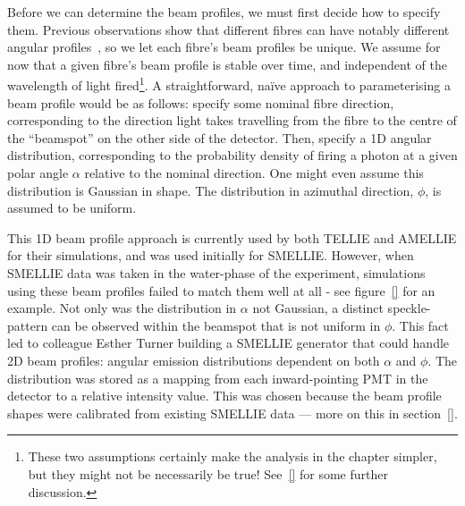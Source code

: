 Before we can determine the beam profiles, we must first decide how to specify them. Previous observations show that different fibres can have notably different angular profiles~\cite{}, so we let each fibre's beam profiles be unique. We assume for now that a given fibre's beam profile is stable over time, and independent of the wavelength of light fired\footnote{These two assumptions certainly make the analysis in the chapter simpler, but they might not be necessarily be true! See~\ref{} for some further discussion.}. A straightforward, na\"{i}ve approach to parameterising a beam profile would be as follows: specify some nominal fibre direction, corresponding to the direction light takes travelling from the fibre to the centre of the ``beamspot'' on the other side of the detector. Then, specify a 1D angular distribution, corresponding to the probability density of firing a photon at a given polar angle $\alpha$ relative to the nominal direction. One might even assume this distribution is Gaussian in shape. The distribution in azimuthal direction, $\phi$, is assumed to be uniform.

This 1D beam profile approach is currently used by both TELLIE and AMELLIE for their simulations, and was used initially for SMELLIE. However, when SMELLIE data was taken in the water-phase of the experiment, simulations using these beam profiles failed to match them well at all - see figure~\ref{} for an example. Not only was the distribution in $\alpha$ not Gaussian, a distinct speckle-pattern can be observed within the beamspot that is not uniform in $\phi$. This fact led to colleague Esther Turner building a SMELLIE generator that could handle 2D beam profiles: angular emission distributions dependent on both $\alpha$ and $\phi$. The distribution was stored as a mapping from each inward-pointing PMT in the detector to a relative intensity value. This was chosen because the beam profile shapes were calibrated from existing SMELLIE data --- more on this in section~\ref{}.

